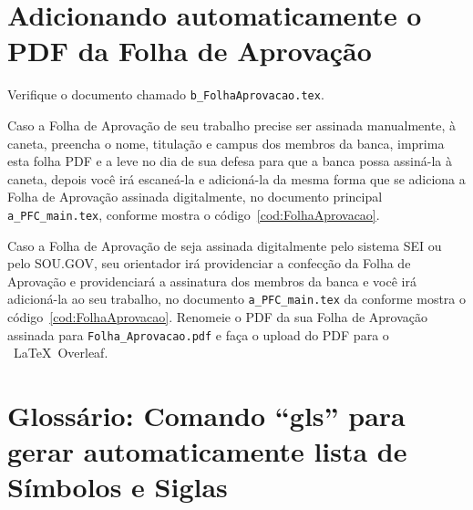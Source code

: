 
\section{Adicionando automaticamente o PDF da Folha de Aprovação}

Verifique o documento chamado \verb|b_FolhaAprovacao.tex|. 

Caso a Folha de Aprovação de seu trabalho precise ser assinada manualmente, à caneta, preencha o nome, titulação e campus dos membros da banca, imprima esta folha PDF e a leve no dia de sua defesa para que a banca possa assiná-la à caneta, depois você irá escaneá-la e adicioná-la da mesma forma que se adiciona a Folha de Aprovação assinada digitalmente, no documento principal \verb|a_PFC_main.tex|, conforme mostra o código~\ref{cod:FolhaAprovacao}.

Caso a Folha de Aprovação de seja assinada digitalmente pelo sistema SEI ou pelo SOU.GOV, seu orientador irá providenciar a confecção da Folha de Aprovação e providenciará a assinatura dos membros da banca e você irá adicioná-la ao seu trabalho, no documento \verb|a_PFC_main.tex| da conforme mostra o código~\ref{cod:FolhaAprovacao}. Renomeie o PDF da sua Folha de Aprovação assinada para \verb|Folha_Aprovacao.pdf| e faça o upload do PDF para o ~\LaTeX~Overleaf. 

\pagebreak

\begin{Codigo}[language=tex, caption=Código da Folha de Aprovação no documento principal {\bf a\_PFC\_main.tex}, label=cod:FolhaAprovacao]
\end{Codigo}


\section{Glossário: Comando ``gls'' para  gerar automaticamente lista de Símbolos e Siglas}
\label{sec:Glossario}

